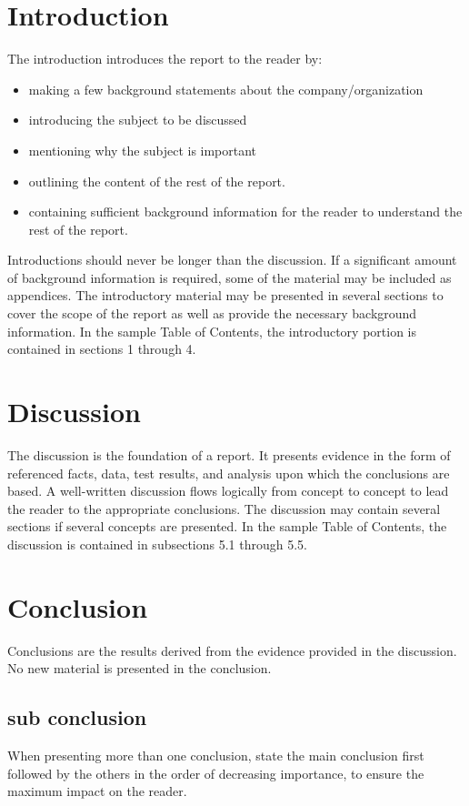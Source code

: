 \documentclass[11pt]{article}
\begin{document}
\section{Introduction}
The introduction introduces the report to the reader by:
\begin{itemize}
	\item making a few background statements about the company/organization
	\item introducing the subject to be discussed
	\item mentioning why the subject is important
	\item outlining the content of the rest of the report.
	\item containing sufficient background information for the reader to understand the rest of the
report.
\end{itemize}
Introductions should never be longer than the discussion. If a significant amount of background information is required, some of the material may be included as appendices.
The introductory material may be presented in several sections to cover the scope of the report as well as provide the necessary background information. In the sample Table of Contents, the introductory portion is contained in sections 1 through 4.

\section{Discussion}
The discussion is the foundation of a report. It presents evidence in the form of referenced facts, data, test results, and analysis upon which the conclusions are based. A well-written discussion flows logically from concept to concept to lead the reader to the appropriate conclusions.
The discussion may contain several sections if several concepts are presented. In the sample Table of Contents, the discussion is contained in subsections 5.1 through 5.5.

\section{Conclusion}
Conclusions are the results derived from the evidence provided in the discussion. No new material is presented in the conclusion.
\subsection{sub conclusion}
When presenting more than one conclusion, state the main conclusion first followed by the others in the order of decreasing importance, to ensure the maximum impact on the reader.
\end{document}
